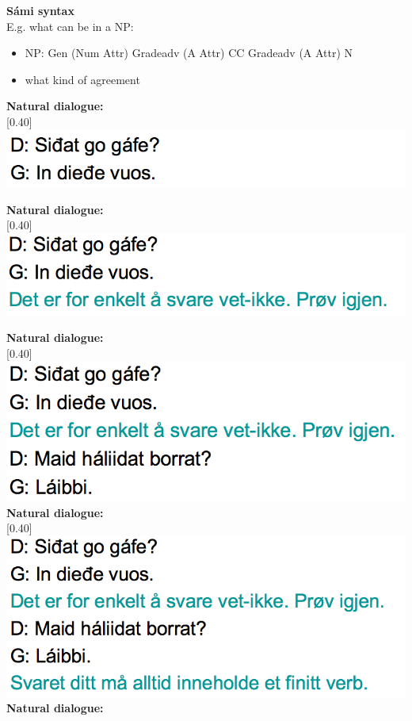 \documentclass[landscape,norsk,11pt]{seminar}
\begin{document}
\begin{slide}
\newslide
\textbf{Sámi syntax}\\
E.g. what can be in a NP:
\begin{itemize}
\item \small{NP: Gen (Num Attr) Gradeadv (A Attr) CC Gradeadv (A Attr) N}  		
\item what kind of agreement
\end{itemize}



\newslide
\textbf{Natural dialogue:} \\

\scalebox{0.40}[0.40]{\includegraphics{img/lgiella1.png}} 

\newslide
\textbf{Natural dialogue:} \\

\scalebox{0.40}[0.40]{\includegraphics{img/lgiella2.png}} 

\newslide
\textbf{Natural dialogue:} \\

\scalebox{0.40}[0.40]{\includegraphics{img/lgiella3.png}} 
\newslide
\textbf{Natural dialogue:} \\

\scalebox{0.40}[0.40]{\includegraphics{img/lgiella4.png}} 
\newslide
\textbf{Natural dialogue:} \\


\end{slide}
\end{document}
